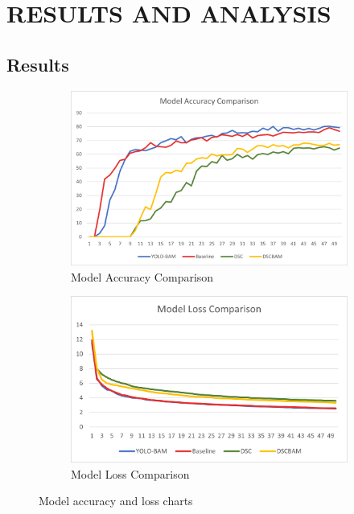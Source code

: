 \chapter {RESULTS AND ANALYSIS} \label{results}
\section{Results}
\begin{figure}[!htbp]
\centering
\begin{subfigure}{.5\textwidth}
  \centering
  \includegraphics[width=0.91\linewidth]{images/ModelAccuracy.png}
  \caption{Model Accuracy Comparison}
  \label{fig:sub1}
\end{subfigure}%
\begin{subfigure}{.5\textwidth}
  \centering
  \includegraphics[width=0.95\linewidth]{images/ModelLoss.png}
  \caption{Model Loss Comparison}
  \label{fig:sub2}
\end{subfigure}
\caption{Model accuracy and loss charts}
\label{fig:resultchart}
\end{figure}

